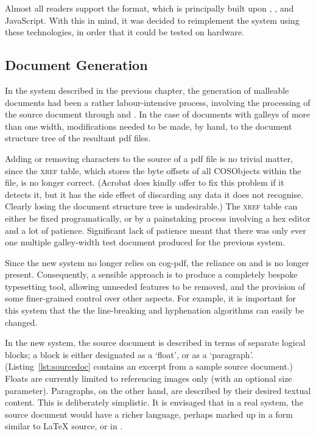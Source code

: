 Almost all \ebook{} readers support the \epub{} format, which is principally built upon \html{}, \css{}, and JavaScript. With this in mind, it was decided to reimplement the system using these technologies, in order that it could be tested on \ebook{} hardware. 



\subsection{Document Generation}
\label{sec:docgen}




In the system described in the previous chapter, the generation of malleable documents had been a rather labour-intensive process, involving the processing of the source document through \troff{} and \pdfdit{}. In the case of documents with galleys of more than one width, modifications needed to be made, by hand, to the document structure tree of the resultant \gls{pdf} files.

Adding or removing characters to the source of a \gls{pdf} file is no trivial matter, since the \textsc{xref} table, which stores the byte offsets of all \glspl{COSObject} within the file, is no longer correct. (Acrobat does kindly offer to fix this problem if it detects it, but it has the side effect of discarding any data it does not recognise. Clearly losing the document structure tree is undesirable.) The \textsc{xref} table can either be fixed programatically, or by a painstaking process involving a hex editor and a lot of patience. Significant lack of patience meant that there was only ever one multiple galley-width test document produced for the previous system.

Since the new system no longer relies on \gls{cog}-\gls{pdf}, the reliance on \troff{} and \pdfdit{} is no longer present. Consequently, a sensible approach is to produce a completely bespoke typesetting tool, allowing unneeded features to be removed, and the provision of some finer-grained control over other aspects. For example, it is important for this system that the the line-breaking and hyphenation algorithms can easily be changed.



In the new system, the source document is described in terms of separate logical blocks; a block is either designated as a `float', or as a `paragraph'. (Listing~\ref{lst:sourcedoc} contains an excerpt from a sample source document.) Floats are currently limited to referencing images only (with an optional size parameter). Paragraphs, on the other hand, are described by their desired textual content. This is deliberately simplistic. It is envisaged that in a real system, the source document would have a richer language, perhaps marked up in a form similar to \LaTeX{} source, or in \xml{}.

